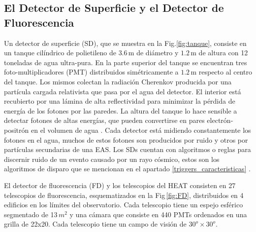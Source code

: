 \subsection{El Detector de Superficie y el Detector de Fluorescencia}
Un detector de superficie (SD), que se muestra en la Fig.\ref{fig:tanque}, consiste en un tanque cilíndrico de polietileno de $3.6\,$m de diámetro y $1.2\,$m de altura con 12 toneladas de agua ultra-pura.  En la parte superior del tanque se encuentran tres foto-multiplicadores (PMT) distribuidos simétricamente a $1.2\,$m respecto al centro del tanque. Los mismos colectan la radiación Cherenkov producida por una partícula cargada relativista que pasa por el agua del detector. {El interior está recubierto por una lámina de alta reflectividad para minimizar la pérdida de energía de los fotones por las paredes}. La altura del tanque lo hace sensible a detectar fotones de altas energías, que pueden convertirse en pares electrón-positrón en el volumen de agua \cite{como_funciona_auger}. Cada detector está midiendo constantemente los fotones en el agua, muchos de estos fotones son producidos por ruido y otros por partículas secundarias de una EAS. Los SDs cuentan con algoritmos o reglas para discernir ruido de un evento causado por un rayo cósmico, estos son los algoritmos de disparo que se mencionan en el apartado \ref{triggers_caracteristicas} .

El detector de fluorescencia (FD) y los telescopios del HEAT consisten en 27 telescopios de fluorescencia, esquematizados en la Fig\,\ref{fig:FD}, distribuidos en 4 edificios en los límites del observatorio. Cada telescopio tiene un espejo esférico segmentado de 13$\,m^2$ y una cámara que consiste en 440 PMTs ordenados en una grilla de 22x20. Cada telescopio tiene un campo de visión de $30^o\times30^o$.


